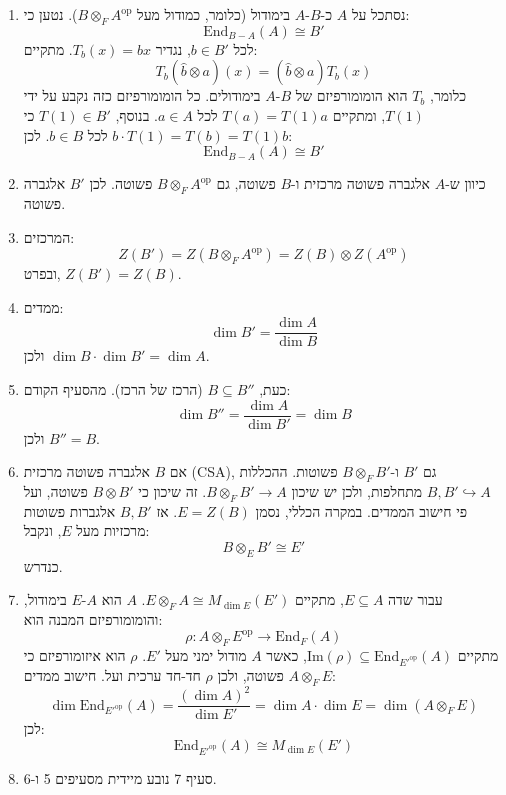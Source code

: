 \documentclass{tstextbook}
\begin{document}
\begin{enumerate}
  \item נסתכל על \(A\) כ-\(B\)-\(A\) בימודול (כלומר, כמודול מעל \(B \otimes_{F} A^{\text{op}}\)). נטען כי: 
$$\mathrm{End}_{B-A}(A) \cong B'$$
לכל \(b \in B'\), נגדיר \(T_b(x) = bx\). מתקיים:
$$T_b(\hat{b} \otimes a)(x) = (\hat{b} \otimes a) T_b(x)$$
כלומר, \(T_b\) הוא הומומורפיזם של \(B\)-\(A\) בימודולים. כל הומומורפיזם כזה נקבע על ידי \(T(1)\), ומתקיים \(T(a) = T(1)a\) לכל \(a \in A\). בנוסף, \(T(1) \in B'\) כי \(b \cdot T(1) = T(b) = T(1) b\) לכל \(b \in B\). לכן:
$$    \mathrm{End}_{B-A}(A) \cong B'    $$


  \item כיוון ש-\(A\) אלגברה פשוטה מרכזית ו-\(B\) פשוטה, גם \(B \otimes_{F} A^{\text{op}}\) פשוטה. לכן \(B'\) אלגברה פשוטה. 


  \item המרכזים: 
$$    Z(B') = Z(B \otimes_{F} A^{\text{op}}) = Z(B) \otimes Z(A^{\text{op}})$$
ובפרט, \(Z(B') = Z(B)\).


  \item ממדים: 
$$    \dim B' = \frac{\dim A}{\dim B}    $$
ולכן \(\dim B \cdot \dim B' = \dim A\).


  \item כעת, \(B \subseteq B''\) (הרכז של הרכז). מהסעיף הקודם: 
$$    \dim B'' = \frac{\dim A}{\dim B'} = \dim B    $$
ולכן \(B'' = B\).


  \item אם \(B\) אלגברה פשוטה מרכזית (CSA), גם \(B'\) ו-\(B \otimes_{F} B'\) פשוטות. ההכללות \(B, B' \hookrightarrow A\) מתחלפות, ולכן יש שיכון \(B \otimes_{F} B' \to A\). זה שיכון כי \(B \otimes B'\) פשוטה, ועל פי חישוב הממדים. במקרה הכללי, נסמן \(E = Z(B)\). אז \(B, B'\) אלגברות פשוטות מרכזיות מעל \(E\), ונקבל: 
$$    B \otimes_{E} B' \cong E'    $$
כנדרש.


  \item עבור שדה \(E \subseteq A\), מתקיים \(E \otimes_{F} A \cong M_{\dim E}(E')\). \(A\) הוא \(A\)-\(E\) בימודול, והומומורפיזם המבנה הוא: 
$$    \rho: A \otimes_{F} E^{\text{op}} \to \mathrm{End}_F(A)    $$
מתקיים \(\mathrm{Im}(\rho) \subseteq \mathrm{End}_{E'^{\text{op}}}(A)\), כאשר \(A\) מודול ימני מעל \(E'\). \(\rho\) הוא איזומורפיזם כי \(A \otimes_{F} E\) פשוטה, ולכן \(\rho\) חד-חד ערכית ועל. חישוב ממדים:
$$
 \dim \mathrm{End}_{E'^{\text{op}}}(A) = \frac{(\dim A)^2}{\dim E'} = \dim A \cdot \dim E = \dim (A \otimes_{F} E) $$
לכן:
$$ \mathrm{End}_{E'^{\text{op}}}(A) \cong M_{\dim E}(E')
 $$


  \item סעיף 7 נובע מיידית מסעיפים 5 ו-6. 


\end{enumerate}
\end{document}
